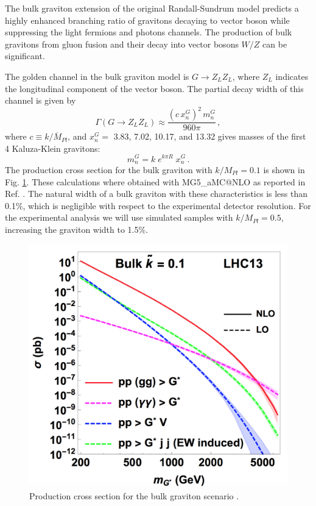 The bulk graviton extension of the original Randall-Sundrum model predicts a highly enhanced branching ratio of gravitons decaying to vector boson while suppressing the light fermions and photons channels. The production of bulk gravitons from gluon fusion and their decay into vector bosons $W/Z$ can be significant. 

The golden channel in the bulk graviton model is $G\rightarrow Z_L Z_L$, where $Z_L$ indicates the longitudinal component of the vector boson. The partial decay width of this channel is given by
\begin{equation}
	\Gamma(G\rightarrow Z_L Z_L) \approx \frac{(c \, x_n^G)^2 \, m^G_n}{960 \pi}\,,
\label{larg:grav}
\end{equation}
where $c\equiv k/\overline{M}_{Pl}$, and $x^G_n = $ 3.83, 7.02, 10.17, and 13.32 gives masses of the first 4 Kaluza-Klein gravitons:
\begin{equation}
	m^G_n = k \; e^{k\pi R} \; x^G_n\,.
\end{equation}
The production cross section for the bulk graviton with $k/M_{Pl} = 0.1$ is shown in Fig. \ref{bulkgrav}. These calculations where obtained with MG5\_aMC@NLO \cite{Alwall:2011uj} as reported in Ref. \cite{Oliveira:2014kla}. The natural width of a bulk graviton with these characteristics is less than 0.1\%, which is negligible with respect to the experimental detector resolution. For the experimental analysis we will use simulated samples with $k/M_{Pl} = 0.5$, increasing the graviton width to 1.5\%. 

\begin{figure}[htb!!]
\centering
\includegraphics[scale=0.45]{figures/theory/bulkgrav.png}
\caption[Bulk Graviton cross section]{Production cross section for the bulk graviton scenario \cite{Oliveira:2014kla}.}
\label{bulkgrav}
\end{figure}

